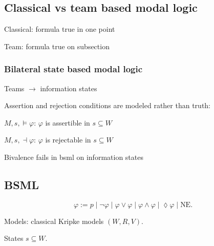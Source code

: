 \subsection{Classical vs team based modal logic}
Classical: formula true in one point

Team: formula true on subsection

\subsubsection{Bilateral state based modal logic}
Teams \(\to\) information states

Assertion and rejection conditions are modeled rather than truth:

\(M,s,\models \varphi\): \(\varphi\) is assertible in \(s\subseteq W\)

\(M,s,\dashv \varphi\): \(\varphi\) is rejectable in \(s\subseteq W\)

Bivalence fails in bsml on information states

\subsection{BSML}

\[
    \varphi := p \mid \neg\varphi \mid\varphi\vee\varphi\mid\varphi\wedge\varphi\mid\lozenge\varphi\mid \text{NE}.
\]

Models: classical Kripke models \((W,R,V)\).

States \(s\subseteq W\).
